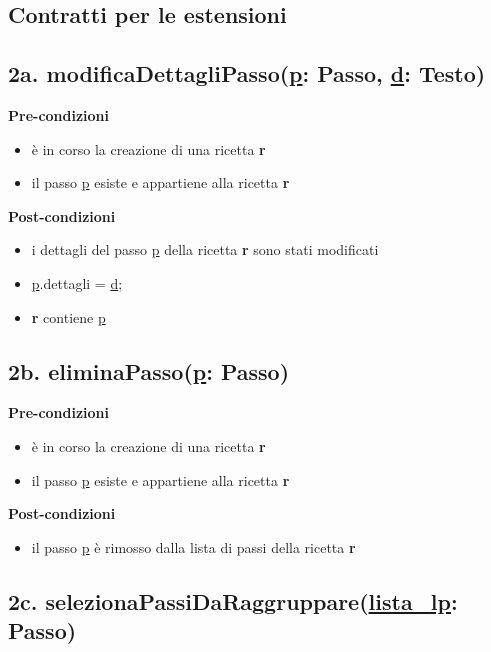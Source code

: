 \documentclass[12pt]{extarticle}
\begin{document}
\newpage
\begin{center}
  \section*{Contratti per le estensioni}
\end{center}

\subsection*{2a. modificaDettagliPasso(\underline{p}: Passo, \underline{d}: Testo)}

\textbf{Pre-condizioni}
\begin{itemize}
  \item è in corso la creazione di una ricetta  \textbf{r}
  \item il passo \underline{p} esiste e appartiene alla ricetta \textbf{r}
\end{itemize}
\textbf{Post-condizioni}
\begin{itemize}
  \item i dettagli del passo \underline{p} della ricetta \textbf{r} sono stati modificati
  \item \underline{p}.dettagli = \underline{d};
  \item \textbf{r} contiene \underline{p}
\end{itemize}

\subsection*{2b. eliminaPasso(\underline{p}: Passo)}

\textbf{Pre-condizioni}
\begin{itemize}
  \item è in corso la creazione di una ricetta  \textbf{r}
  \item il passo \underline{p} esiste e appartiene alla ricetta \textbf{r}
\end{itemize}
\textbf{Post-condizioni}
\begin{itemize}
  \item il passo \underline{p} è rimosso dalla lista di passi della ricetta \textbf{r}
\end{itemize}

\subsection*{2c. selezionaPassiDaRaggruppare(\underline{lista\_lp}: Passo)}
\end{document}
